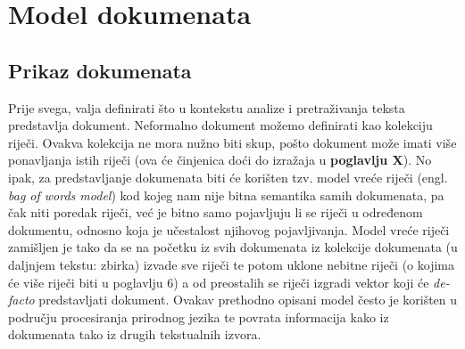 \documentclass[times, utf8, zavrsni]{fer}
\begin{document}
\chapter{Model dokumenata}

\section{Prikaz dokumenata}
Prije svega, valja definirati što u kontekstu analize i pretraživanja teksta predstavlja dokument. Neformalno dokument možemo definirati kao kolekciju riječi. Ovakva kolekcija ne mora nužno biti skup, pošto dokument može imati više ponavljanja istih riječi (ova će činjenica doći do izražaja u \textbf{poglavlju X}). No ipak, za predstavljanje dokumenata biti će korišten tzv. model vreće riječi (engl. \textit{bag of words model}) kod kojeg nam nije bitna semantika samih dokumenata, pa čak niti poredak riječi, već je bitno samo pojavljuju li se riječi u određenom dokumentu, odnosno koja je učestalost njihovog pojavljivanja.
Model vreće riječi zamišljen je tako da se na početku iz svih dokumenata iz kolekcije dokumenata (u daljnjem tekstu: zbirka) izvade sve riječi te potom uklone nebitne riječi (o kojima će više riječi biti u poglavlju 6) a od preostalih se riječi izgradi vektor koji će \textit{de-facto} predstavljati dokument. Ovakav prethodno opisani model često je korišten u području procesiranja prirodnog jezika te povrata informacija kako iz dokumenata tako iz drugih tekstualnih izvora.
\end{document}
